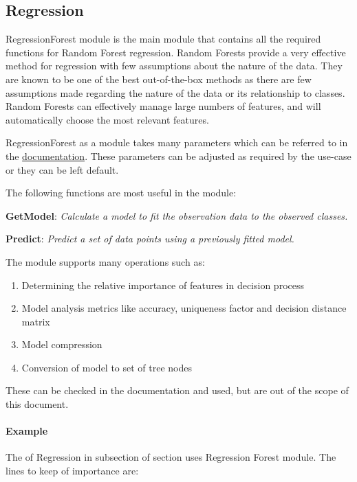 \documentclass[a4paper,oneside,12pt]{book}
\begin{document}
\subsection{Regression}

RegressionForest module is the main module that contains all the required functions for Random Forest regression. Random Forests provide a very effective method for regression with few assumptions about the nature of the data. They are known to be one of the best out-of-the-box methods as there are few assumptions made regarding the nature of the data or its relationship to classes. Random Forests can effectively manage large numbers of features, and will automatically choose the most relevant features. 

RegressionForest as a module takes many parameters which can be referred to in the \href{https://cdn.hpccsystems.com/pdf/ml/LearningTrees.pdf}{documentation}. These parameters can be adjusted as required by the use-case or they can be left default. 

The following functions are most useful in the module:

\textbf{GetModel}: \textit{Calculate a model to fit the observation data to the observed classes.}

\textbf{Predict}: \textit{Predict a set of data points using a previously fitted model.}

The module supports many operations such as: 

\begin{enumerate}
    \item Determining the relative importance of features in decision process
    \item Model analysis metrics like accuracy, uniqueness factor and decision distance matrix
    \item Model compression
    \item Conversion of model to set of tree nodes
\end{enumerate}

These can be checked in the documentation and used, but are out of the scope of this document.

\paragraph{Example}

The  of Regression in  subsection of section  uses Regression Forest module. The lines to keep of importance are:
\end{document}
